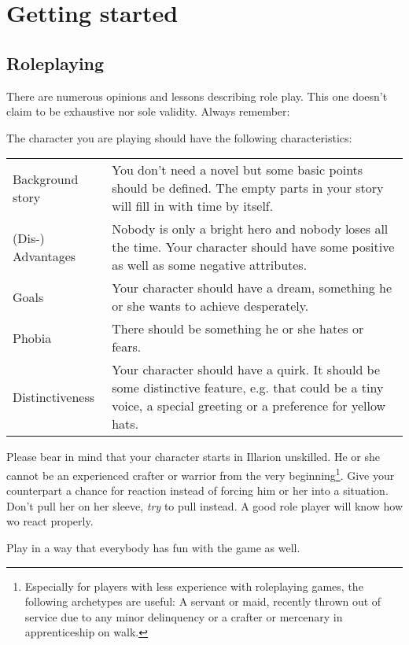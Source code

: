 \documentclass[a4paper,11pt]{scrreprt}
\begin{document}
\tableofcontents
\chapter{Getting started}
\section{Roleplaying}

There are numerous opinions and lessons describing role play. This one doesn't claim to be exhaustive nor sole validity. Always remember:
\begin{center}
\end{center}

The character you are playing should have the following characteristics: 
\begin{table}[h]
\begin{tabular}{ l p{12.5cm}}
Background story & You don't need a novel but some basic points should be 
defined. The empty parts in your story will fill in with time by 
itself. \\
(Dis-) Advantages & Nobody is only a bright hero and nobody loses all the 
time. Your character should have some positive as well as some negative attributes. \\
Goals & Your character should have a dream, something he or she 
wants to achieve desperately. \\
Phobia & There should be something he or she hates or fears. \\
Distinctiveness & Your character should have a quirk. It should be some distinctive feature, e.g. that could be a tiny voice, a 
special greeting or a preference for yellow hats. 
\end{tabular}
\end{table}

Please bear in mind that your character starts in Illarion unskilled. He or she cannot be an experienced crafter or warrior from the very beginning\footnote{Especially for players with less experience with roleplaying games, the following archetypes are useful: A servant or maid, recently thrown out of service due to any minor delinquency or a crafter or mercenary in apprenticeship on walk.}.
Give your counterpart a chance for reaction instead of forcing him or her into a situation. Don't pull her on her sleeve, \emph{try} to pull instead. A good role player will know how wo react properly.

Play in a way that everybody has fun with the game as well.
\end{document}
